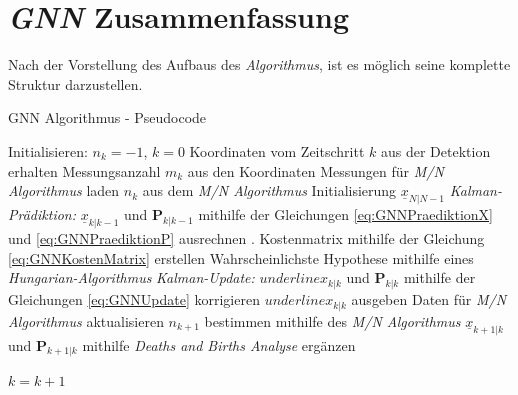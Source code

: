 \documentclass[10pt,a4paper]{article}
\begin{document}
\section{\textit{GNN} Zusammenfassung}
Nach der Vorstellung des Aufbaus des \textit{Algorithmus}, ist es möglich seine komplette Struktur darzustellen.\\
\begin{algorithm}
\caption{GNN Algorithmus - Pseudocode}
\label{alg:GNNAlgorithm}
\begin{algorithmic}[1]
\State Initialisieren: $n_k = -1$, $k = 0$
  \State Koordinaten vom Zeitschritt $k$ aus der Detektion erhalten
  \State Messungsanzahl $m_k$ aus den Koordinaten
  \State Messungen für \textit{M/N Algorithmus} laden
  \EndIf
  \State $n_k$ aus dem \textit{M/N Algorithmus}
  \State Initialisierung $\underline{x}_{N|N-1}$
  \EndIf
          \State \textit{Kalman-Prädiktion: }$\underline{x}_{k|k-1}$ und $\textbf{P}_{k|k-1}$  mithilfe der Gleichungen  \ref{eq:GNNPraediktionX} und                 \ref{eq:GNNPraediktionP} ausrechnen .
          \State Kostenmatrix mithilfe der Gleichung \eqref{eq:GNNKostenMatrix} erstellen 
          \State Wahrscheinlichste Hypothese mithilfe eines \textit{Hungarian-Algorithmus}
          \State \textit{Kalman-Update: }$underline{x}_{k|k}$ und $\textbf{P}_{k|k}$ mithilfe der Gleichungen \ref{eq:GNNUpdate} korrigieren
          \State $underline{x}_{k|k}$ ausgeben
      \EndFor
      \State Daten für \textit{M/N Algorithmus} aktualisieren
      \State $n_{k+1}$ bestimmen mithilfe des  \textit{M/N Algorithmus}
      \State $\underline{x}_{k+1|k}$ und $\textbf{P}_{k+1|k}$ mithilfe \textit{Deaths and Births Analyse} ergänzen
      
  \EndIf
  $k = k+1$
\EndWhile


\end{algorithmic}
\end{algorithm}
\end{document}
